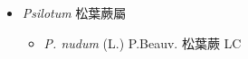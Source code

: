 
  \begin{itemize}
 \item[] \textit{Psilotum} 松葉蕨屬
                                
  \begin{itemize}
        \item[] \textit{P. nudum} (L.) P.Beauv.  松葉蕨   LC
  \end{itemize}
  \end{itemize}
